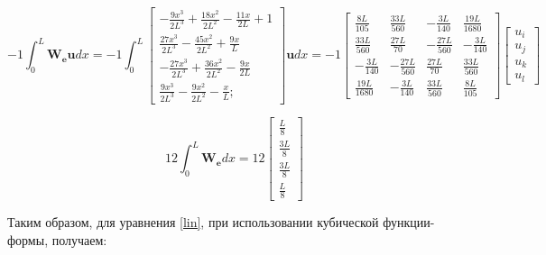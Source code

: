 $$  -1  
\int_0^L \mathbf{W_e} \mathbf{u} d x=
 -1  
\int_0^L \begin{bmatrix}
-\frac{9x^3}{2L^3}+\frac{18x^2}{2L^2}-\frac{11x}{2L} + 1\\
\frac{27x^3}{2L^3}-\frac{45x^2}{2L^2}+\frac{9x}{L}\\
-\frac{27x^3}{2L^3}+\frac{36x^2}{2L^2}-\frac{9x}{2L}\\
\frac{9x^3}{2L^3}-\frac{9x^2}{2L^2}-\frac{x}{L};
\end{bmatrix} \mathbf{u} d x=
 -1  
\begin{bmatrix}
\frac{8L}{105} & \frac{33L}{560} & -\frac{3L}{140} & \frac{19L}{1680}\\
\frac{33L}{560} & \frac{27L}{70} & -\frac{27L}{560} & -\frac{3L}{140} \\
-\frac{3L}{140} & -\frac{27L}{560} & \frac{27L}{70} & \frac{33L}{560} \\
\frac{19L}{1680} & -\frac{3L}{140} & \frac{33L}{560} & \frac{8L}{105}
\end{bmatrix}
\begin{bmatrix}
u_i \\
u_j \\
u_k\\
u_l
\end{bmatrix}$$


$$
12 \int_0^L \mathbf{W_e} d x
=
12
\begin{bmatrix}
	\frac{L}{8} \\
	\frac{3L}{8}\\
	\frac{3L}{8}\\
	\frac{L}{8}
\end{bmatrix}
$$

\newpage
Таким образом, для уравнения \ref{lin}, при использовании кубической функции-формы,  получаем:


